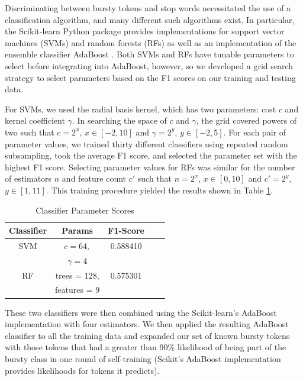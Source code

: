 \documentclass{acm_proc_article-sp}
\begin{document}
Discriminating between bursty tokens and stop words necessitated the use of a classification algorithm, and many different such algorithms exist.
In particular, the Scikit-learn Python package provides implementations for support vector machines (SVMs) and random forests (RFs) as well as an implementation of the ensemble classifier AdaBoost \cite{scikit-learn}.
Both SVMs and RFs have tunable parameters to select before integrating into AdaBoost, however, so we developed a grid search strategy to select parameters based on the F1 scores on our training and testing data.

For SVMs, we used the radial basis kernel, which has two parameters: cost $c$ and kernel coefficient $\gamma$.
In searching the space of $c$ and $\gamma$, the grid covered powers of two such that $c = 2^x$, $x \in [-2, 10]$ and $\gamma = 2^y$, $y \in [-2, 5]$.
For each pair of parameter values, we trained thirty different classifiers using repeated random subsampling, took the average F1 score, and selected the parameter set with the highest F1 score.
Selecting parameter values for RFs was similar for the number of estimators $n$ and feature count $c'$ such that $n = 2^x$, $x \in [0, 10]$ and $c' = 2^y$, $y \in [1, 11]$.
This training procedure yielded the results shown in Table \ref{tab:scores}.

\begin{table}[htdp]
\caption{Classifier Parameter Scores}
\begin{center}
\begin{tabular}{|c|c|c|c|c|}
\hline
\textbf{Classifier} & \textbf{Params} & \textbf{F1-Score} \\ \hline
SVM & $c=64,$ & 0.588410 \\ 
& $\gamma=4$ & \\ \hline
RF & trees = 128, & 0.575301 \\
& features = 9 &  \\ \hline
\end{tabular}
\end{center}
\label{tab:scores}
\end{table}

These two classifiers were then combined using the Scikit-learn's AdaBoost implementation with four estimators.
We then applied the resulting AdaBoost classifier to all the training data and expanded our set of known bursty tokens with those tokens that had a greater than 90\% likelihood of being part of the bursty class in one round of self-training (Scikit's AdaBoost implementation provides likelihoods for tokens it predicts).
\end{document}
